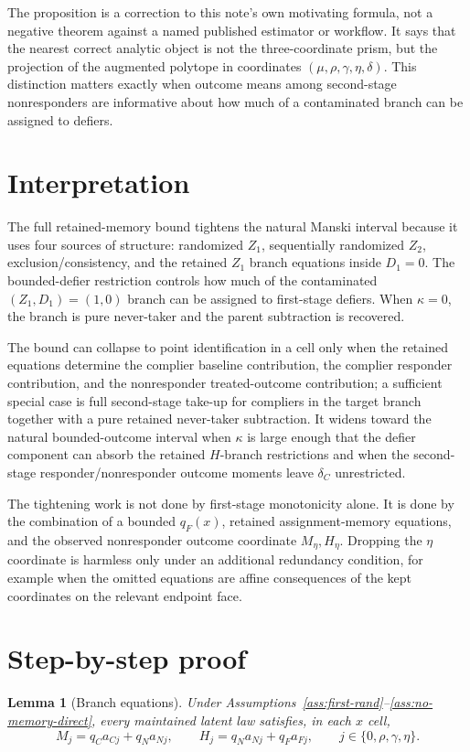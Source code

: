 \documentclass[11pt]{article}
\theoremstyle{definition}
\theoremstyle{plain}
\newtheorem{lemma}{Lemma}
\theoremstyle{remark}
\begin{document}
The proposition is a correction to this note's own motivating formula, not a negative theorem against a named published estimator or workflow.
It says that the nearest correct analytic object is not the three-coordinate prism, but the projection of the augmented polytope in coordinates \((\mu,\rho,\gamma,\eta,\delta)\).
This distinction matters exactly when outcome means among second-stage nonresponders are informative about how much of a contaminated branch can be assigned to defiers.

\section{Interpretation}
The full retained-memory bound tightens the natural Manski interval because it uses four sources of structure: randomized \(Z_1\), sequentially randomized \(Z_2\), exclusion/consistency, and the retained \(Z_1\) branch equations inside \(D_1=0\).
The bounded-defier restriction controls how much of the contaminated \((Z_1,D_1)=(1,0)\) branch can be assigned to first-stage defiers.
When \(\kappa=0\), the branch is pure never-taker and the parent subtraction is recovered.

The bound can collapse to point identification in a cell only when the retained equations determine the complier baseline contribution, the complier responder contribution, and the nonresponder treated-outcome contribution; a sufficient special case is full second-stage take-up for compliers in the target branch together with a pure retained never-taker subtraction.
It widens toward the natural bounded-outcome interval when \(\kappa\) is large enough that the defier component can absorb the retained \(H\)-branch restrictions and when the second-stage responder/nonresponder outcome moments leave \(\delta_C\) unrestricted.

The tightening work is not done by first-stage monotonicity alone.
It is done by the combination of a bounded \(q_F(x)\), retained assignment-memory equations, and the observed nonresponder outcome coordinate \(M_\eta,H_\eta\).
Dropping the \(\eta\) coordinate is harmless only under an additional redundancy condition, for example when the omitted equations are affine consequences of the kept coordinates on the relevant endpoint face.

\section{Step-by-step proof}
\begin{lemma}[Branch equations]\label{lem:branch-equations}
Under Assumptions~\ref{ass:first-rand}--\ref{ass:no-memory-direct}, every maintained latent law satisfies, in each \(x\) cell,
\[
M_j=q_C a_{Cj}+q_N a_{Nj},\qquad
H_j=q_N a_{Nj}+q_F a_{Fj},\qquad
j\in\{0,\rho,\gamma,\eta\}.
\]
\end{lemma}
\end{document}
